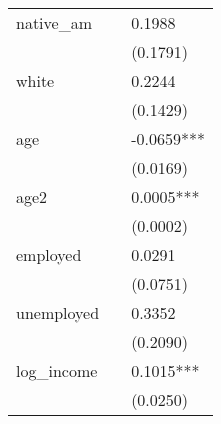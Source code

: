 \begin{table}
\begin{center}
\begin{tabular}{lll}
native\_am          &                   & 0.1988              \\
                    &                   & (0.1791)            \\
white               &                   & 0.2244              \\
                    &                   & (0.1429)            \\
age                 &                   & -0.0659***          \\
                    &                   & (0.0169)            \\
age2                &                   & 0.0005***           \\
                    &                   & (0.0002)            \\
employed            &                   & 0.0291              \\
                    &                   & (0.0751)            \\
unemployed          &                   & 0.3352              \\
                    &                   & (0.2090)            \\
log\_income         &                   & 0.1015***           \\
                    &                   & (0.0250)            \\
\hline
\end{tabular}
\end{center}
\end{table}